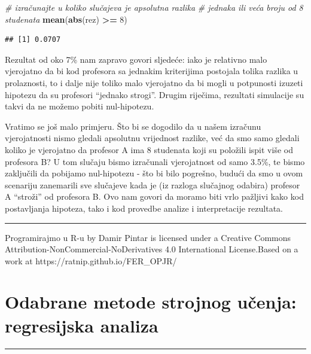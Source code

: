 \documentclass[]{book}
\newenvironment{Shaded}{\begin{snugshade}}{\end{snugshade}}
\newcommand{\KeywordTok}[1]{\textcolor[rgb]{0.13,0.29,0.53}{\textbf{#1}}}
\newcommand{\DecValTok}[1]{\textcolor[rgb]{0.00,0.00,0.81}{#1}}
\newcommand{\StringTok}[1]{\textcolor[rgb]{0.31,0.60,0.02}{#1}}
\newcommand{\CommentTok}[1]{\textcolor[rgb]{0.56,0.35,0.01}{\textit{#1}}}
\newcommand{\OperatorTok}[1]{\textcolor[rgb]{0.81,0.36,0.00}{\textbf{#1}}}
\newcommand{\NormalTok}[1]{#1}
\theoremstyle{definition}
\theoremstyle{definition}
\theoremstyle{definition}
\theoremstyle{remark}
\begin{document}
\begin{Shaded}
\begin{Highlighting}[]
\CommentTok{# izračunajte u koliko slučajeva je apsolutna razlika}
\CommentTok{# jednaka ili veća broju od 8 studenata}
\KeywordTok{mean}\NormalTok{(}\KeywordTok{abs}\NormalTok{(rez) }\OperatorTok{>=}\StringTok{ }\DecValTok{8}\NormalTok{)}
\end{Highlighting}
\end{Shaded}

\begin{verbatim}
## [1] 0.0707
\end{verbatim}

Rezultat od oko 7\% nam zapravo govori sljedeće: iako je relativno malo
vjerojatno da bi kod profesora sa jednakim kriterijima postojala tolika
razlika u prolaznosti, to i dalje nije toliko malo vjerojatno da bi
mogli u potpunosti izuzeti hipotezu da su profesori ``jednako strogi''.
Drugim riječima, rezultati simulacije su takvi da ne možemo pobiti
nul-hipotezu.

Vratimo se još malo primjeru. Što bi se dogodilo da u našem izračunu
vjerojatnosti nismo gledali apsolutnu vrijednost razlike, već da smo
samo gledali koliko je vjerojatno da profesor A ima 8 studenata koji su
položili ispit više od profesora B? U tom slučaju bismo izračunali
vjerojatnost od samo 3.5\%, te bismo zaključili da pobijamo nul-hipotezu
- što bi bilo pogrešno, budući da smo u ovom scenariju zanemarili sve
slučajeve kada je (iz razloga slučajnog odabira) profesor A ``stroži''
od profesora B. Ovo nam govori da moramo biti vrlo pažljivi kako kod
postavljanja hipoteza, tako i kod provedbe analize i interpretacije
rezultata.

\begin{center}\rule{0.5\linewidth}{\linethickness}\end{center}

{Programirajmo u R-u} by Damir Pintar is licensed under a Creative
Commons Attribution-NonCommercial-NoDerivatives 4.0 International
License.Based on a work at https://ratnip.github.io/FER\_OPJR/

\chapter{Odabrane metode strojnog učenja: regresijska
analiza}\label{regresija}

\begin{center}\rule{0.5\linewidth}{\linethickness}\end{center}
\end{document}
